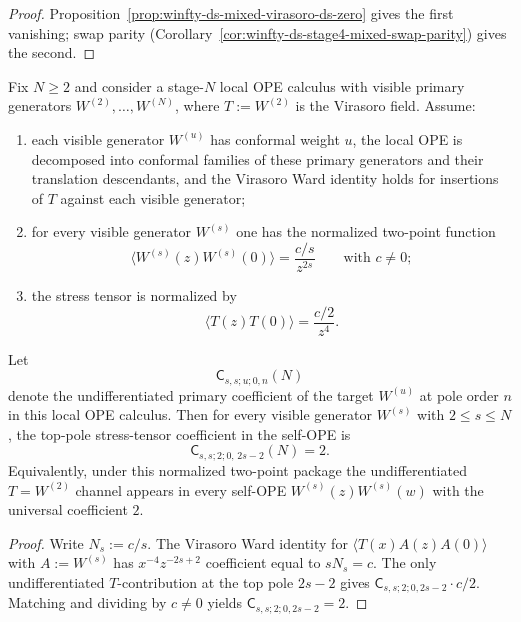 \begin{proof}
Proposition~\ref{prop:winfty-ds-mixed-virasoro-ds-zero} gives the first vanishing; swap parity (Corollary~\ref{cor:winfty-ds-stage4-mixed-swap-parity}) gives the second.
\end{proof}

\begin{proposition}
\label{prop:winfty-formal-self-t-coefficient}
Fix $N \ge 2$ and consider a stage-$N$ local OPE calculus with visible
primary generators $W^{(2)},\dots,W^{(N)}$, where
$T:=W^{(2)}$ is the Virasoro field. Assume:
\begin{enumerate}[label=\textup{(\roman*)}]
\item each visible generator $W^{(u)}$ has conformal weight $u$, the
 local OPE is decomposed into conformal families of these primary
 generators and their translation descendants, and the Virasoro Ward
 identity holds for insertions of $T$ against each visible generator;
\item for every visible generator $W^{(s)}$ one has the normalized
 two-point function
 \[
 \langle W^{(s)}(z)W^{(s)}(0)\rangle=\frac{c/s}{z^{2s}}
 \qquad\text{with } c\neq 0;
 \]
\item the stress tensor is normalized by
 \[
 \langle T(z)T(0)\rangle=\frac{c/2}{z^4}.
 \]
\end{enumerate}
Let
\[
\mathsf{C}_{s,s;u;0,n}(N)
\]
denote the undifferentiated primary coefficient of the target
$W^{(u)}$ at pole order $n$ in this local OPE calculus. Then for every
visible generator $W^{(s)}$ with $2 \le s \le N$, the top-pole
stress-tensor coefficient in the self-OPE is
\[
\mathsf{C}_{s,s;2;0,\,2s-2}(N)=2.
\]
Equivalently, under this normalized two-point package the
undifferentiated $T=W^{(2)}$ channel appears in every self-OPE
$W^{(s)}(z)W^{(s)}(w)$ with the universal coefficient $2$.
\end{proposition}

\begin{proof}
Write $N_s:=c/s$. The Virasoro Ward identity for $\langle T(x)A(z)A(0)\rangle$ with $A:=W^{(s)}$ has $x^{-4}z^{-2s+2}$ coefficient equal to $sN_s=c$. The only undifferentiated $T$-contribution at the top pole $2s-2$ gives $\mathsf{C}_{s,s;2;0,2s-2}\cdot c/2$. Matching and dividing by $c\neq 0$ yields $\mathsf{C}_{s,s;2;0,2s-2}=2$.
\end{proof}


